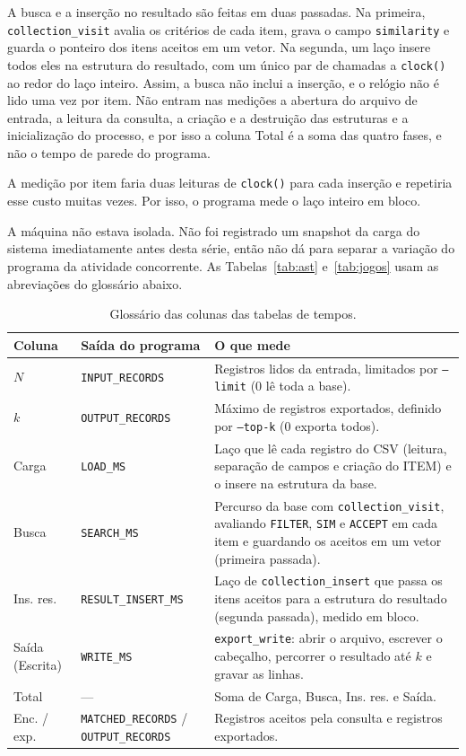 \documentclass[11pt,a4paper]{article}
\newcommand{\cab}[1]{\rowcolor{gray!22}#1}
\begin{document}
A busca e a inserção no resultado são feitas em duas passadas. Na primeira, \texttt{collection\_visit} avalia os critérios de cada item, grava o campo \texttt{similarity} e guarda o ponteiro dos itens aceitos em um vetor. Na segunda, um laço insere todos eles na estrutura do resultado, com um único par de chamadas a \texttt{clock()} ao redor do laço inteiro. Assim, a busca não inclui a inserção, e o relógio não é lido uma vez por item. Não entram nas medições a abertura do arquivo de entrada, a leitura da consulta, a criação e a destruição das estruturas e a inicialização do processo, e por isso a coluna Total é a soma das quatro fases, e não o tempo de parede do programa.

A medição por item faria duas leituras de \texttt{clock()} para cada inserção e repetiria esse custo muitas vezes. Por isso, o programa mede o laço inteiro em bloco.

A máquina não estava isolada. Não foi registrado um snapshot da carga do sistema imediatamente antes desta série, então não dá para separar a variação do programa da atividade concorrente. As Tabelas~\ref{tab:ast} e~\ref{tab:jogos} usam as abreviações do glossário abaixo.

\begin{table}[!htbp]
\centering
\caption{Glossário das colunas das tabelas de tempos.}
\label{tab:glossario}
\small
\begin{tabularx}{\textwidth}{@{}l l Y@{}}
\toprule
\cab{\textbf{Coluna} & \textbf{Saída do programa} & \textbf{O que mede}} \\
\midrule
$N$ & \texttt{INPUT\_RECORDS} & Registros lidos da entrada, limitados por \texttt{--limit} (0 lê toda a base). \\
$k$ & \texttt{OUTPUT\_RECORDS} & Máximo de registros exportados, definido por \texttt{--top-k} (0 exporta todos). \\
Carga & \texttt{LOAD\_MS} & Laço que lê cada registro do CSV (leitura, separação de campos e criação do ITEM) e o insere na estrutura da base. \\
Busca & \texttt{SEARCH\_MS} & Percurso da base com \texttt{collection\_visit}, avaliando \texttt{FILTER}, \texttt{SIM} e \texttt{ACCEPT} em cada item e guardando os aceitos em um vetor (primeira passada). \\
Ins. res. & \texttt{RESULT\_INSERT\_MS} & Laço de \texttt{collection\_insert} que passa os itens aceitos para a estrutura do resultado (segunda passada), medido em bloco. \\
Saída (Escrita) & \texttt{WRITE\_MS} & \texttt{export\_write}: abrir o arquivo, escrever o cabeçalho, percorrer o resultado até $k$ e gravar as linhas. \\
Total & --- & Soma de Carga, Busca, Ins. res. e Saída. \\
Enc. / exp. & \texttt{MATCHED\_RECORDS} / \texttt{OUTPUT\_RECORDS} & Registros aceitos pela consulta e registros exportados. \\
\bottomrule
\end{tabularx}
\end{table}
\end{document}
